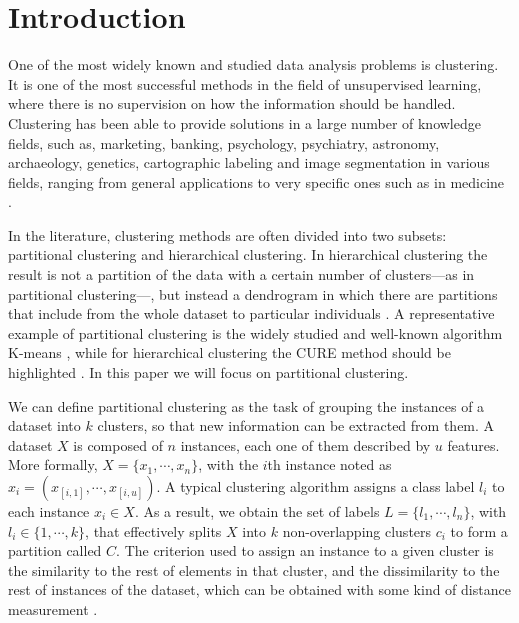 \documentclass[review]{elsarticle}
\begin{document}
\section{Introduction} \label{sec:Intro}

One of the most widely known and studied data analysis problems is clustering. It is one of the most successful methods in the field of unsupervised learning, where there is no supervision on how the information should be handled. Clustering has been able to provide solutions in a large number of knowledge fields, such as, marketing, banking, psychology, psychiatry, astronomy, archaeology, genetics,\cite{Everitt:2009:CA:1538772} cartographic labeling \cite{araujo2019improving} and image segmentation in various fields, ranging from general applications \cite{wang2018non} to very specific ones such as in medicine \cite{verma2016improved, aparajeeta2016modified}.

In the literature, clustering methods are often divided into two subsets: partitional clustering and hierarchical clustering. In hierarchical clustering the result is not a partition of the data with a certain number of clusters---as in partitional clustering---, but instead a dendrogram in which there are partitions that include from the whole dataset to particular individuals \cite{Everitt:2009:CA:1538772}. A representative example of partitional clustering is the widely studied and well-known algorithm K-means \cite{wu2009top}, while for hierarchical clustering the CURE method should be highlighted \cite{guha1998cure}. In this paper we will focus on partitional clustering.

We can define partitional clustering as the task of grouping the instances of a dataset into $k$ clusters, so that new information can be extracted from them. A dataset $X$ is composed of $n$ instances, each one of them described by $u$ features. More formally, $X = \{x_1, \cdots, x_n\}$, with the $i$th instance noted as $x_i = (x_{[i,1]}, \cdots, x_{[i,u]})$. A typical clustering algorithm assigns a class label $l_i$ to each instance $x_i \in X$. As a result, we obtain the set of labels $L = \{l_1, \cdots, l_n\}$, with $l_i \in \{1, \cdots, k\}$, that effectively splits $X$ into $k$ non-overlapping clusters $c_i$ to form a partition called $C$. The criterion used to assign an instance to a given cluster is the similarity to the rest of elements in that cluster, and the dissimilarity to the rest of instances of the dataset, which can be obtained with some kind of distance measurement \cite{jain1999data}.
\end{document}
